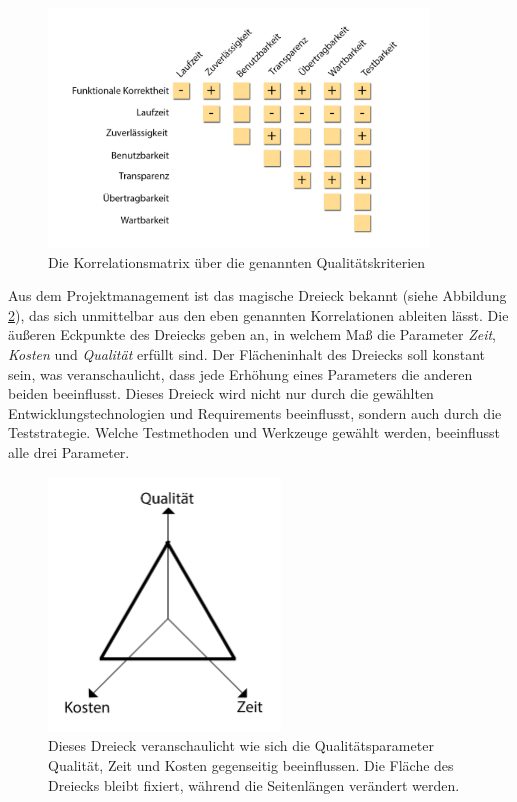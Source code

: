 \begin{figure}[h] 
  \centering
     \includegraphics[width=0.9\textwidth]{figures/korrelationsmatrix.png}
  \caption{Die Korrelationsmatrix über die genannten Qualitätskriterien\cite{hoffmann_software-qualitat_2013}}
  \label{fig:korrelationsmatrix}
\end{figure}

Aus dem Projektmanagement ist das magische Dreieck bekannt (siehe Abbildung \ref{fig:magic_triangle}), das sich unmittelbar aus den eben genannten Korrelationen ableiten lässt. Die äußeren Eckpunkte des Dreiecks geben an, in welchem Maß die Parameter \textit{Zeit}, \textit{Kosten} und \textit{Qualität} erfüllt sind. Der Flächeninhalt des Dreiecks soll konstant sein, was veranschaulicht, dass jede Erhöhung eines Parameters die anderen beiden beeinflusst. Dieses Dreieck wird nicht nur durch die gewählten Entwicklungstechnologien und Requirements beeinflusst, sondern auch durch die Teststrategie. Welche Testmethoden und Werkzeuge gewählt werden, beeinflusst alle drei Parameter.

\begin{figure}[h] 
  \centering
     \includegraphics[width=0.55\textwidth]{figures/magic_triangle.png}
  \caption{Dieses Dreieck veranschaulicht wie sich die Qualitätsparameter Qualität, Zeit und Kosten gegenseitig beeinflussen. Die Fläche des Dreiecks bleibt fixiert, während die Seitenlängen verändert werden.}
  \label{fig:magic_triangle}
\end{figure}


